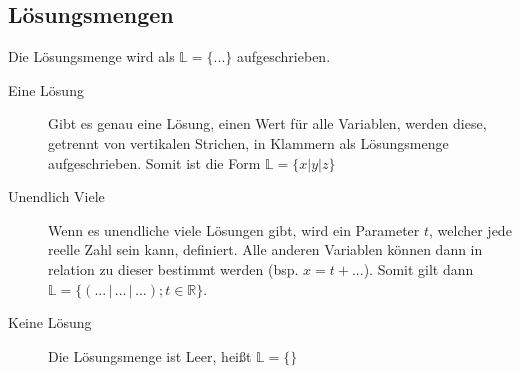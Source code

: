 \documentclass{article}
\begin{document}
\subsection{Lösungsmengen}
Die Lösungsmenge wird als $\mathbb{L} = \{...\}$ aufgeschrieben.
 
\begin{description}
 \item[Eine Lösung] Gibt es genau eine Lösung, einen Wert für alle Variablen, werden diese, getrennt von vertikalen Strichen, in Klammern als Lösungsmenge aufgeschrieben. Somit ist die Form $\mathbb{L} = \{x \vert y \vert z\}$
  
 \item[Unendlich Viele] Wenn es unendliche viele Lösungen gibt, wird ein Parameter $t$, welcher jede reelle Zahl sein kann, definiert. Alle anderen Variablen können dann in relation zu dieser bestimmt werden (bsp. $x = t + ...$).
Somit gilt dann $\mathbb{L} = \{(... \,\vert\, ... \,\vert\, ...); t \in \mathbb{R}\}$.
 
 \item[Keine Lösung] Die Lösungsmenge ist Leer, heißt $\mathbb{L} = \{\}$
\end{description}
\end{document}
